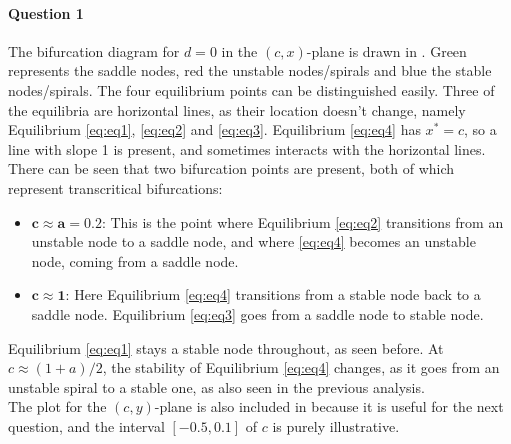 \documentclass[a4paper,11pt]{article}
\begin{document}
\paragraph{Question 1}\; The bifurcation diagram for $d=0$ in the $(c,x)$-plane is drawn in . Green represents the saddle nodes, red the unstable nodes/spirals and
blue the stable nodes/spirals. The four equilibrium points can be distinguished easily. Three of the equilibria are horizontal lines, as their location doesn't change, 
namely Equilibrium \eqref{eq:eq1}, \eqref{eq:eq2} and \eqref{eq:eq3}. Equilibrium \eqref{eq:eq4} has $x^*=c$, so a line with slope 1 is present, and sometimes interacts with 
the horizontal lines.
There can be seen that two bifurcation points are present,
both of which represent transcritical bifurcations: 
\begin{itemize}
	\item $\mathbf{c\approx a=0.2}$: This is the point where Equilibrium \eqref{eq:eq2} transitions from an unstable node to a saddle node, and where \eqref{eq:eq4} becomes
	an unstable node, coming from a saddle node. 
	\item $\mathbf{c\approx 1}$: Here Equilibrium \eqref{eq:eq4} transitions from a stable node back to a saddle node. Equilibrium \eqref{eq:eq3} goes from a saddle node to 
	stable node.
\end{itemize}
Equilibrium \eqref{eq:eq1} stays a stable node throughout, as seen before. At $c\approx (1+a)/2$, the stability of Equilibrium \eqref{eq:eq4} changes, as it goes from an 
unstable spiral to a stable one, as also seen in the previous analysis.\\
The plot for the $(c,y)$-plane is also included in  because it is useful for the next question, and the interval $[-0.5,0.1]$ of $c$ is purely illustrative. 
\end{document}
